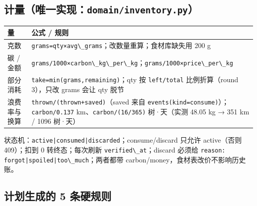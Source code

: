 \subsection{\texorpdfstring{计量（唯一实现：\texttt{domain/inventory.py}）}{计量（唯一实现：domain/inventory.py）}}\label{ux8ba1ux91cfux552fux4e00ux5b9eux73b0domaininventory.py}

{\def\LTcaptype{none} %
\begin{longtable}[]{@{}
  >{\raggedright\arraybackslash}p{}
  >{\raggedright\arraybackslash}p{}@{}}
\toprule\noalign{}
\begin{minipage}[b]{\linewidth}\raggedright
量
\end{minipage} & \begin{minipage}[b]{\linewidth}\raggedright
公式 / 规则
\end{minipage} \\
\midrule\noalign{}
\endhead
\bottomrule\noalign{}
\endlastfoot
克数 &
\passthrough{\lstinline!grams=qty×avg\_grams!}；改数量重算；食材库缺失用
200 g \\
碳 / 金额 &
\passthrough{\lstinline!grams/1000×carbon\_kg\_per\_kg!}；\passthrough{\lstinline!grams/1000×price\_per\_kg!} \\
部分消耗 & \passthrough{\lstinline!take=min(grams,remaining)!}；qty 按
\passthrough{\lstinline!left/total!} 比例折算（round 3），只改 grams
会让 qty 脱节 \\
浪费率与换算 & \passthrough{\lstinline!thrown/(thrown+saved)!}（saved
来自
\passthrough{\lstinline!events(kind=consume)!}）；\passthrough{\lstinline!carbon/0.137!}
km、\passthrough{\lstinline!carbon/(16/365)!} 树·天（实测 48.05 kg → 351
km / 1096 树·天） \\
\end{longtable}
}

状态机：\passthrough{\lstinline!active|consumed|discarded!}；consume/discard
只允许 active（否则 409）；扣到 0 转终态；每次刷新
\passthrough{\lstinline!verified\_at!}；discard 必须给
\passthrough{\lstinline!reason: forgot|spoiled|too\_much!}；两者都带
carbon/money，食材表改价不影响历史账。

\subsection{计划生成的 5
条硬规则}\label{ux8ba1ux5212ux751fux6210ux7684-5-ux6761ux786cux89c4ux5219}

